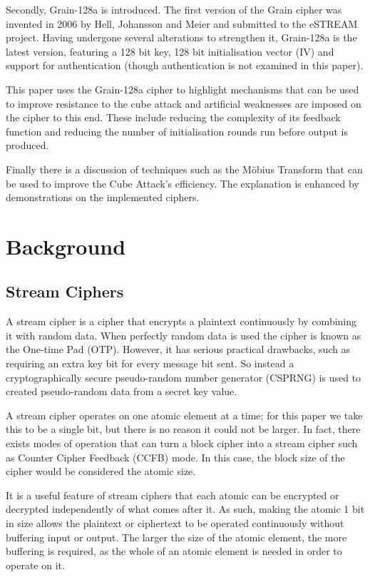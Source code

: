\documentclass{report}
\let\Oldsection\section
\renewcommand{\section}{\FloatBarrier\Oldsection}
\begin{document}
Secondly, Grain-128a is introduced. The first version of the Grain cipher was invented in 2006 by Hell, Johansson and Meier \cite{Grain128aSpec} and submitted to the eSTREAM project. Having undergone several alterations to strengthen it, Grain-128a is the latest version, featuring a 128 bit key, 128 bit initialisation vector (IV) and support for authentication (though authentication is not examined in this paper).

This paper uses the Grain-128a cipher to highlight mechanisms that can be used to improve resistance to the cube attack and artificial weaknesses are imposed on the cipher to this end. These include reducing the complexity of its feedback function and reducing the number of initialisation rounds run before output is produced.

Finally there is a discussion of techniques such as the M\"{o}bius Transform that can be used to improve the Cube Attack's efficiency. The explanation is enhanced by demonstrations on the implemented ciphers.

\chapter{Background}
\section{Stream Ciphers}
A stream cipher is a cipher that encrypts a plaintext continuously by combining it with random data. When perfectly random data is used the cipher is known as the One-time Pad (OTP)\cite{otpDef}. However, it has serious practical drawbacks, such as requiring an extra key bit for every message bit sent\cite{otpDef}. So instead a cryptographically secure pseudo-random number generator (CSPRNG) is used to created pseudo-random data from a secret key value.

A stream cipher operates on one atomic element at a time; for this paper we take this to be a single bit, but there is no reason it could not be larger. In fact, there exists modes of operation that can turn a block cipher into a stream cipher such as Counter Cipher Feedback (CCFB) mode\cite{counterMode}. In this case, the block size of the cipher would be considered the atomic size.

It is a useful feature of stream ciphers that each atomic can be encrypted or decrypted independently of what comes after it. As such, making the atomic 1 bit in size allows the plaintext or ciphertext to be operated continuously without buffering input or output. The larger the size of the atomic element, the more buffering is required, as the whole of an atomic element is needed in order to operate on it.
\end{document}
